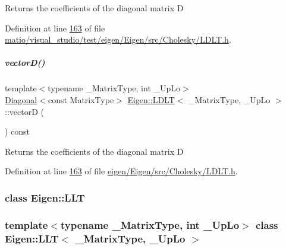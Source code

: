 \begin{DoxyReturn}{Returns}
the coefficients of the diagonal matrix D 
\end{DoxyReturn}


Definition at line \hyperlink{matio_2visual__studio_2test_2eigen_2_eigen_2src_2_cholesky_2_l_d_l_t_8h_source_l00163}{163} of file \hyperlink{matio_2visual__studio_2test_2eigen_2_eigen_2src_2_cholesky_2_l_d_l_t_8h_source}{matio/visual\+\_\+studio/test/eigen/\+Eigen/src/\+Cholesky/\+L\+D\+L\+T.\+h}.

\mbox{\label{group___cholesky___module_af60b2f826a38a00070e0efccf0572066}} 
\subparagraph{\texorpdfstring{vector\+D()}{vectorD()}\hspace{0.1cm}{\footnotesize\ttfamily [2/2]}}
{\footnotesize\ttfamily template$<$typename \+\_\+\+Matrix\+Type, int \+\_\+\+Up\+Lo$>$ \\
\hyperlink{group___core___module_class_eigen_1_1_diagonal}{Diagonal}$<$const Matrix\+Type$>$ \hyperlink{group___cholesky___module_class_eigen_1_1_l_d_l_t}{Eigen\+::\+L\+D\+LT}$<$ \+\_\+\+Matrix\+Type, \+\_\+\+Up\+Lo $>$\+::vectorD (\begin{DoxyParamCaption}{ }\end{DoxyParamCaption}) const\hspace{0.3cm}{\ttfamily [inline]}}

\begin{DoxyReturn}{Returns}
the coefficients of the diagonal matrix D 
\end{DoxyReturn}


Definition at line \hyperlink{eigen_2_eigen_2src_2_cholesky_2_l_d_l_t_8h_source_l00163}{163} of file \hyperlink{eigen_2_eigen_2src_2_cholesky_2_l_d_l_t_8h_source}{eigen/\+Eigen/src/\+Cholesky/\+L\+D\+L\+T.\+h}.

\label{class_eigen_1_1_l_l_t}
\subsubsection{class Eigen\+:\+:L\+LT}
\subsubsection*{template$<$typename \+\_\+\+Matrix\+Type, int \+\_\+\+Up\+Lo$>$\newline
class Eigen\+::\+L\+L\+T$<$ \+\_\+\+Matrix\+Type, \+\_\+\+Up\+Lo $>$}


